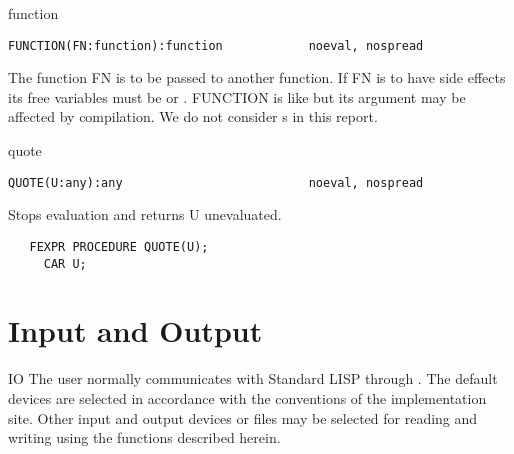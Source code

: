 \begin{Function}{function}
\begin{verbatim}
FUNCTION(FN:function):function            noeval, nospread
\end{verbatim}
   The  function FN  is to  be passed  to another  function.   If
   FN  is to have  side effects its free  variables must be 
   or  .   FUNCTION is like  but its  argument may be
   affected  by compilation.  We  do not consider s in this
   report.


\end{Function}
\begin{Function}{quote}
\begin{verbatim}
QUOTE(U:any):any                          noeval, nospread
\end{verbatim}
   Stops evaluation and returns U unevaluated.
\begin{verbatim}
   FEXPR PROCEDURE QUOTE(U);
     CAR U;
\end{verbatim}
\end{Function}


\section{Input and Output}
\begin{Introduction}{IO}
The user normally communicates with Standard LISP through
. The default devices are selected in accordance
with the conventions of the implementation site. Other input and
output devices or files may be selected for reading and writing using
the functions described herein.
\end{Introduction}


